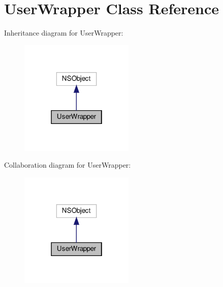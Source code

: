 \hypertarget{interfaceUserWrapper}{}\section{User\+Wrapper Class Reference}
\label{interfaceUserWrapper}


Inheritance diagram for User\+Wrapper\+:
\nopagebreak
\begin{figure}[H]
\begin{center}
\leavevmode
\includegraphics[width=154pt]{interfaceUserWrapper__inherit__graph}
\end{center}
\end{figure}


Collaboration diagram for User\+Wrapper\+:
\nopagebreak
\begin{figure}[H]
\begin{center}
\leavevmode
\includegraphics[width=154pt]{interfaceUserWrapper__coll__graph}
\end{center}
\end{figure}
